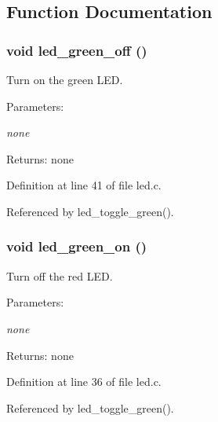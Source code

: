 \subsection{Function Documentation}
\subsubsection{\setlength{\rightskip}{0pt plus 5cm}void led\_\-green\_\-off ()}\label{led_8c_9d8c7fecfd14584602c0c1ed091c469c}


Turn on the green LED. 

\begin{Desc}
\item[Parameters:]
\begin{description}
\item[{\em none}]\end{description}
\end{Desc}
\begin{Desc}
\item[Returns:]none \end{Desc}


Definition at line 41 of file led.c.

Referenced by led\_\-toggle\_\-green().
\subsubsection{\setlength{\rightskip}{0pt plus 5cm}void led\_\-green\_\-on ()}\label{led_8c_48bed5f60ae924d8e6cde6cb1135d419}


Turn off the red LED. 

\begin{Desc}
\item[Parameters:]
\begin{description}
\item[{\em none}]\end{description}
\end{Desc}
\begin{Desc}
\item[Returns:]none \end{Desc}


Definition at line 36 of file led.c.

Referenced by led\_\-toggle\_\-green().
